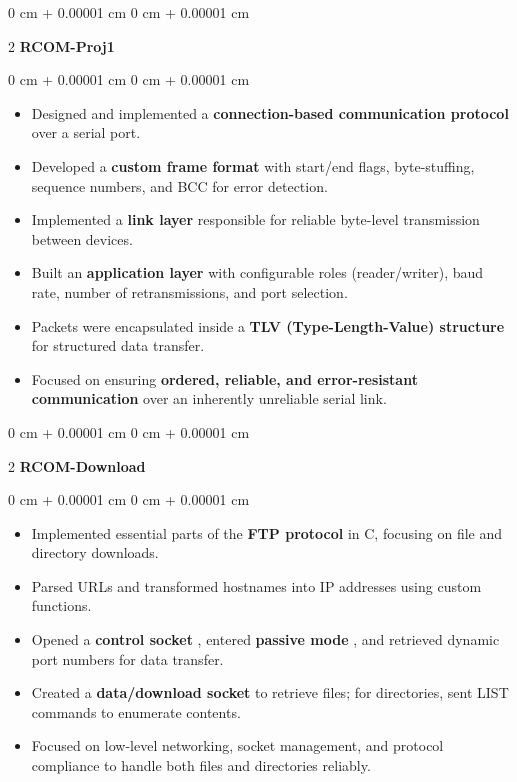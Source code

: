 \documentclass[10pt, letterpaper]{article}
\newenvironment{highlights}{
        \begin{itemize}[
            topsep=0.10 cm,
            parsep=0.10 cm,
            partopsep=0pt,
            itemsep=0pt,
            leftmargin=0 cm + 10pt
        ]
    }{
        \end{itemize}
    } %
\newenvironment{onecolentry}{
        \begin{adjustwidth}{
            0 cm + 0.00001 cm
        }{
            0 cm + 0.00001 cm
        }
    }{
        \end{adjustwidth}
    } %
\newenvironment{twocolentry}[2][]{
        \onecolentry
        \def\secondColumn{#2}
        \setcolumnwidth{\fill, 6.5cm}
        \begin{paracol}{2}
    }{
        \switchcolumn \raggedleft \secondColumn
        \end{paracol}
        \endonecolentry
    } %
\begin{document}
\vspace{0.2 cm}
\begin{twocolentry}{ }\textbf{RCOM-Proj1}\end{twocolentry}\vspace{0.10 cm}\begin{onecolentry}\begin{highlights}
\item Designed and implemented a  \textbf{connection-based communication protocol}  over a serial port.

\item Developed a  \textbf{custom frame format}  with start/end flags, byte-stuffing, sequence numbers, and BCC for error detection.

\item Implemented a  \textbf{link layer}  responsible for reliable byte-level transmission between devices.

\item Built an  \textbf{application layer}  with configurable roles (reader/writer), baud rate, number of retransmissions, and port selection.

\item Packets were encapsulated inside a  \textbf{TLV (Type-Length-Value) structure}  for structured data transfer.

\item Focused on ensuring  \textbf{ordered, reliable, and error-resistant communication}  over an inherently unreliable serial link.

\end{highlights} \end{onecolentry}
\vspace{0.2 cm}
\begin{twocolentry}{ }\textbf{RCOM-Download}\end{twocolentry}\vspace{0.10 cm}\begin{onecolentry}\begin{highlights}
\item Implemented essential parts of the  \textbf{FTP protocol}  in C, focusing on file and directory downloads.

\item Parsed URLs and transformed hostnames into IP addresses using custom functions.

\item Opened a  \textbf{control socket} , entered  \textbf{passive mode} , and retrieved dynamic port numbers for data transfer.

\item Created a  \textbf{data/download socket}  to retrieve files; for directories, sent LIST commands to enumerate contents.

\item Focused on low-level networking, socket management, and protocol compliance to handle both files and directories reliably.

\end{highlights} \end{onecolentry}
\end{document}
